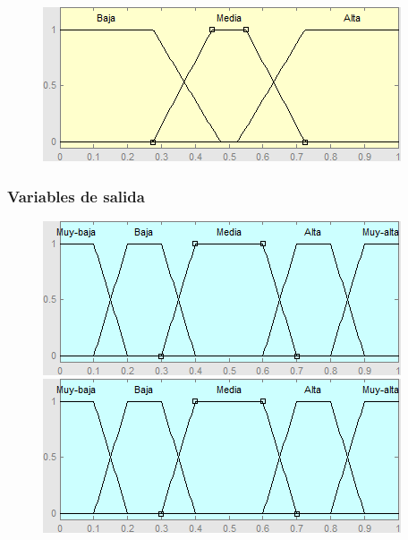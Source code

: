 \begin{figure}[H]
	\centering
	\begin{minipage}{.5\textwidth}
		\centering
		\includegraphics[scale=0.67]{images/variables/vrpd.png}
	\end{minipage}%
	\begin{minipage}{.5\textwidth}
		\centering
	\end{minipage}
\end{figure}


\subsubsection{Variables de salida}


\begin{figure}[H]
	\centering
	\begin{minipage}{.5\textwidth}
		\centering
		\includegraphics[scale=0.67]{images/variables/salida.png}
	\end{minipage}%
	\begin{minipage}{.5\textwidth}
		\centering
		\includegraphics[scale=0.67]{images/variables/salida.png}
	\end{minipage}
\end{figure}

